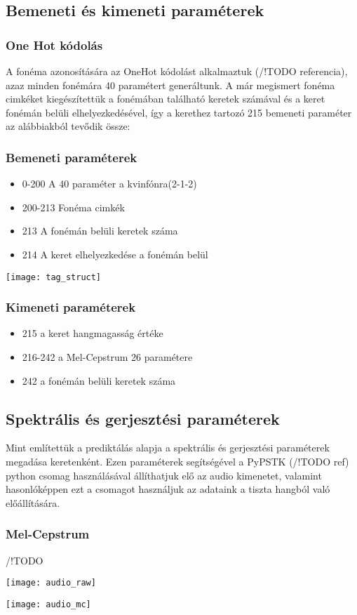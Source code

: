 \subsection{Bemeneti és kimeneti paraméterek}
\subsubsection{One Hot kódolás}
A fonéma azonosítására az OneHot kódolást alkalmaztuk (/!TODO referencia), azaz minden fonémára 40 paramétert generáltunk. A már megismert fonéma cimkéket kiegészítettük a fonémában található keretek számával és a keret fonémán belüli elhelyezkedésével, így a kerethez tartozó 215 bemeneti paraméter az alábbiakból tevődik össze:
\subsubsection{Bemeneti paraméterek}
\begin{minipage}{0.5\textwidth}
\begin{itemize}
	\item 0-200 A 40 paraméter a kvinfónra(2-1-2)
	\item 200-213 Fonéma cimkék
	\item 213 A fonémán belüli keretek száma
	\item 214 A keret elhelyezkedése a fonémán belül
\end{itemize} 
\end{minipage} \hfill
\begin{minipage}{0.5\textwidth}
\texttt{[image: tag\_struct]}
\end{minipage} \hfill
\subsubsection{Kimeneti paraméterek}
\begin{itemize}
	\item 215 a keret hangmagasság értéke
	\item 216-242 a Mel-Cepstrum 26 paramétere
	\item 242 a fonémán belüli keretek száma
\end{itemize}
\subsection{Spektrális és gerjesztési paraméterek}
Mint említettük a prediktálás alapja a spektrális és gerjesztési paraméterek megadása keretenként. Ezen paraméterek segítségével a PyPSTK (/!TODO ref) python csomag használásával állíthatjuk elő az audio kimenetet, valamint hasonlóképpen ezt a csomagot használjuk az adataink a tiszta hangból való előállítására.
\subsubsection{Mel-Cepstrum}
/!TODO

\texttt{[image: audio\_raw]}

\texttt{[image: audio\_mc]}